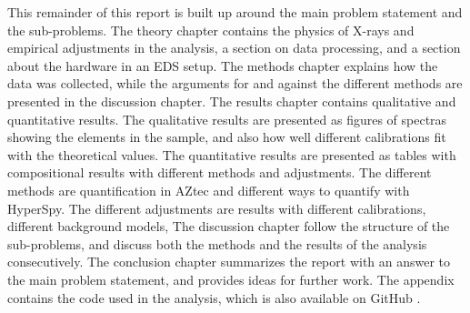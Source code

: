 




This remainder of this report is built up around the main problem statement and the sub-problems.
The theory chapter contains the physics of X-rays and empirical adjustments in the analysis, a section on data processing, and a section about the hardware in an EDS setup.
The methods chapter explains how the data was collected, while the arguments for and against the different methods are presented in the discussion chapter.
The results chapter contains qualitative and quantitative results.
The qualitative results are presented as figures of spectras showing the elements in the sample, and also how well different calibrations fit with the theoretical values.
The quantitative results are presented as tables with compositional results with different methods and adjustments.
The different methods are quantification in AZtec and different ways to quantify with HyperSpy.
The different adjustments are results with different calibrations, different background models, 
The discussion chapter follow the structure of the sub-problems, and discuss both the methods and the results of the analysis consecutively.
The conclusion chapter summarizes the report with an answer to the main problem statement, and provides ideas for further work.
The appendix contains the code used in the analysis, which is also available on GitHub .